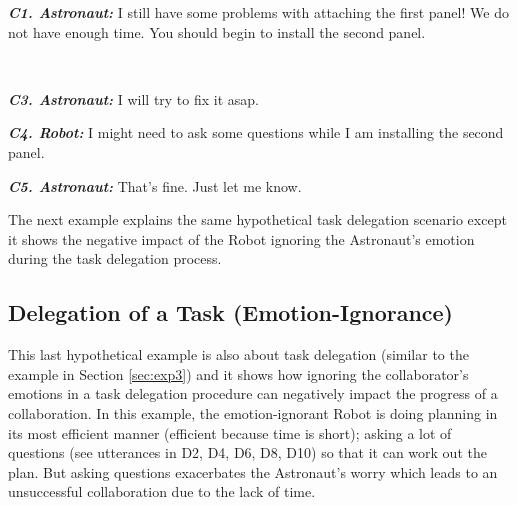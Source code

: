 \begin{description}
  \item \textit{\textbf{C1. Astronaut:}} I still have some problems with
  attaching the first panel! We do not have enough time. You should begin to
  install the second panel.\\

  \item {}\\

  \item \textit{\textbf{C3. Astronaut:}} I will try to fix it asap.\\

  \item \textit{\textbf{C4. Robot:}} I might need to ask some questions while I
  am installing the second panel.\\

  \item \textit{\textbf{C5. Astronaut:}} That's fine. Just let me know.
  
\end{description}

The next example explains the same hypothetical task delegation scenario except
it shows the negative impact of the Robot ignoring the Astronaut's emotion
during the task delegation process.

\subsection{Delegation of a Task (Emotion-Ignorance)}
\label{sec:exp4}

This last hypothetical example is also about task delegation (similar to the
example in Section \ref{sec:exp3}) and it shows how ignoring the collaborator's
emotions in a task delegation procedure can negatively impact the progress of a
collaboration. In this example, the emotion-ignorant Robot is doing planning in
its most efficient manner (efficient because time is short); asking a lot of
questions (see utterances in D2, D4, D6, D8, D10) so that it can work out the
plan. But asking questions exacerbates the Astronaut's worry which leads to an
unsuccessful collaboration due to the lack of time. 

